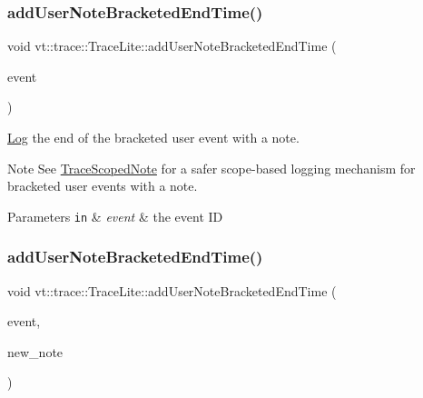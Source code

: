 \subsubsection{\texorpdfstring{add\+User\+Note\+Bracketed\+End\+Time()}{addUserNoteBracketedEndTime()}\hspace{0.1cm}{\footnotesize\ttfamily [1/2]}}
{\footnotesize\ttfamily void vt\+::trace\+::\+Trace\+Lite\+::add\+User\+Note\+Bracketed\+End\+Time (\begin{DoxyParamCaption}\item[{\hyperlink{namespacevt_1_1trace_a64a7185f3e102df8d8258f263ccd1582}{Trace\+Event\+I\+D\+Type} const}]{event }\end{DoxyParamCaption})}



\hyperlink{structvt_1_1trace_1_1_log}{Log} the end of the bracketed user event with a note. 

\begin{DoxyNote}{Note}
See {\ttfamily \hyperlink{structvt_1_1trace_1_1_trace_scoped_note}{Trace\+Scoped\+Note}} for a safer scope-\/based logging mechanism for bracketed user events with a note.
\end{DoxyNote}

\begin{DoxyParams}[1]{Parameters}
\mbox{\tt in}  & {\em event} & the event ID \\
\hline
\end{DoxyParams}
\mbox{\label{structvt_1_1trace_1_1_trace_lite_a98d0f24ca2f8c70fc2c5fcc2e97b0023}} 
\subsubsection{\texorpdfstring{add\+User\+Note\+Bracketed\+End\+Time()}{addUserNoteBracketedEndTime()}\hspace{0.1cm}{\footnotesize\ttfamily [2/2]}}
{\footnotesize\ttfamily void vt\+::trace\+::\+Trace\+Lite\+::add\+User\+Note\+Bracketed\+End\+Time (\begin{DoxyParamCaption}\item[{\hyperlink{namespacevt_1_1trace_a64a7185f3e102df8d8258f263ccd1582}{Trace\+Event\+I\+D\+Type} const}]{event,  }\item[{std\+::string const \&}]{new\+\_\+note }\end{DoxyParamCaption})}



